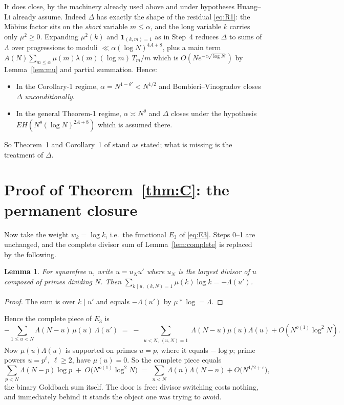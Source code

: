 \documentclass[11pt,a4paper]{article}
\theoremstyle{plain}
\newtheorem{lemma}[theorem]{Lemma}
\theoremstyle{definition}
\begin{document}
It does close, by the machinery already used above and under hypotheses
Huang--Li already assume. Indeed $\Delta$ has exactly the shape of the
residual \eqref{eq:R1}: the M\"obius factor sits on the \emph{short}
variable $m\le\alpha$, and the long variable $k$ carries only
$\mu^2\ge0$. Expanding $\mu^2(k)$ and $\mathbf 1_{(k,m)=1}$ as in Step~4
reduces $\Delta$ to sums of $\Lambda$ over progressions to moduli
$\ll\alpha(\log N)^{4A+8}$, plus a main term
$A(N)\sum_{m\le\alpha}\mu(m)\lambda(m)(\log m)\,T_m/m$ which is
$O(Ne^{-c\sqrt{\log N}})$ by Lemma~\ref{lem:mu} and partial summation.
Hence:
\begin{itemize}
\item In the Corollary-1 regime, $\alpha=N^{1-\theta'}<N^{1/2}$ and
      Bombieri--Vinogradov closes $\Delta$ \emph{unconditionally}.
\item In the general Theorem-1 regime, $\alpha\asymp N^{\theta}$ and
      $\Delta$ closes under the hypothesis
      $EH(N^{\theta}(\log N)^{2A+8})$ which is assumed there.
\end{itemize}
So Theorem~1 and Corollary~1 of \cite{HL} stand as stated; what is
missing is the treatment of $\Delta$.

\section{Proof of Theorem~\ref{thm:C}: the permanent closure}\label{sec:C}

Now take the weight $w_k=\log k$, i.e.\ the functional $E_3$ of
\eqref{eq:E3}. Steps 0--1 are unchanged, and the complete divisor sum of
Lemma~\ref{lem:complete} is replaced by the following.

\begin{lemma}\label{lem:completelog}
For squarefree $u$, write $u=u_N u'$ where $u_N$ is the largest divisor
of $u$ composed of primes dividing $N$. Then
$\sum_{k\mid u,\ (k,N)=1}\mu(k)\log k=-\Lambda(u')$.
\end{lemma}

\begin{proof}
The sum is over $k\mid u'$ and equals $-\Lambda(u')$ by
$\mu*\log=\Lambda$.
\end{proof}

Hence the complete piece of $E_3$ is
\[
  -\sum_{1\le u<N}\Lambda(N-u)\,\mu(u)\,\Lambda(u')
  \;=\; -\sum_{\substack{u<N,\ (u,N)=1}}\Lambda(N-u)\mu(u)\Lambda(u)
        + O(N^{o(1)}\log^2 N).
\]
Now $\mu(u)\Lambda(u)$ is supported on primes $u=p$, where it equals
$-\log p$; prime powers $u=p^\ell$, $\ell\ge2$, have $\mu(u)=0$. So the
complete piece equals
\begin{equation}\label{eq:goldbachback}
  \sum_{p<N}\Lambda(N-p)\log p \;+\;O\bigl(N^{o(1)}\log^2N\bigr)
  \;=\;\sum_{n<N}\Lambda(n)\Lambda(N-n)+O\bigl(N^{1/2+\varepsilon}\bigr),
\end{equation}
the binary Goldbach sum itself. The door is free: divisor switching
costs nothing, and immediately behind it stands the object one was
trying to avoid.
\end{document}
